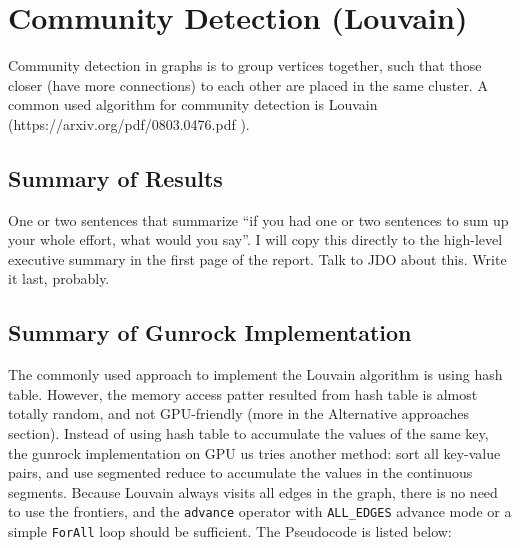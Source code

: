 \documentclass[10pt,article,oneside]{memoir}
\begin{document}
\chapter{Community Detection
(Louvain)}\label{community-detection-louvain}

Community detection in graphs is to group vertices together, such that
those closer (have more connections) to each other are placed in the
same cluster. A common used algorithm for community detection is Louvain
(https://arxiv.org/pdf/0803.0476.pdf ).

\section{Summary of Results}\label{summary-of-results-1}

One or two sentences that summarize ``if you had one or two sentences to
sum up your whole effort, what would you say''. I will copy this
directly to the high-level executive summary in the first page of the
report. Talk to JDO about this. Write it last, probably.

\section{Summary of Gunrock
Implementation}\label{summary-of-gunrock-implementation-1}

The commonly used approach to implement the Louvain algorithm is using
hash table. However, the memory access patter resulted from hash table
is almost totally random, and not GPU-friendly (more in the Alternative
approaches section). Instead of using hash table to accumulate the
values of the same key, the gunrock implementation on GPU us tries
another method: sort all key-value pairs, and use segmented reduce to
accumulate the values in the continuous segments. Because Louvain always
visits all edges in the graph, there is no need to use the frontiers,
and the \texttt{advance} operator with \texttt{ALL\_EDGES} advance mode
or a simple \texttt{ForAll} loop should be sufficient. The Pseudocode is
listed below:
\end{document}
